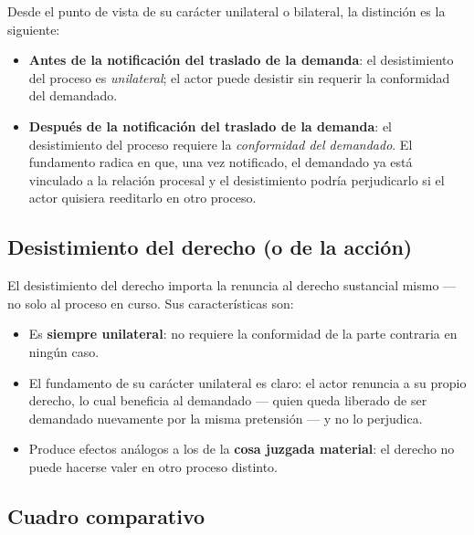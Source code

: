 \documentclass[12pt,oneside]{book}
\begin{document}
Desde el punto de vista de su carácter unilateral o bilateral, la distinción es la siguiente:

\begin{itemize}
    \item \textbf{Antes de la notificación del traslado de la demanda}: el desistimiento del proceso es \emph{unilateral}; el actor puede desistir sin requerir la conformidad del demandado.
    \item \textbf{Después de la notificación del traslado de la demanda}: el desistimiento del proceso requiere la \emph{conformidad del demandado}. El fundamento radica en que, una vez notificado, el demandado ya está vinculado a la relación procesal y el desistimiento podría perjudicarlo si el actor quisiera reeditarlo en otro proceso.
\end{itemize}

\subsection{Desistimiento del derecho (o de la acción)}

El desistimiento del derecho importa la renuncia al derecho sustancial mismo --- no solo al proceso en curso. Sus características son:

\begin{itemize}
    \item Es \textbf{siempre unilateral}: no requiere la conformidad de la parte contraria en ningún caso.
    \item El fundamento de su carácter unilateral es claro: el actor renuncia a su propio derecho, lo cual beneficia al demandado --- quien queda liberado de ser demandado nuevamente por la misma pretensión --- y no lo perjudica.
    \item Produce efectos análogos a los de la \textbf{cosa juzgada material}: el derecho no puede hacerse valer en otro proceso distinto.
\end{itemize}

\subsection{Cuadro comparativo}
\end{document}
